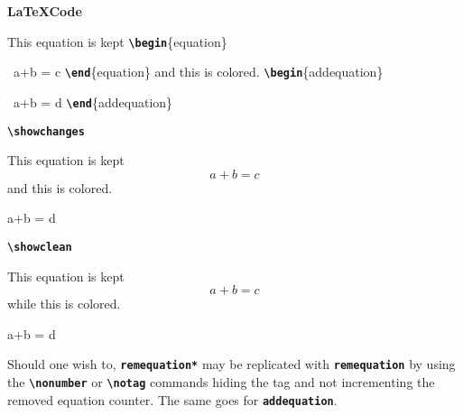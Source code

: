 \documentclass[a4paper]{ltxdoc}
\newcommand{\writecommand}[1]{\texttt{\textbf{{\textbackslash#1}}}}
\newcommand{\writeenv}[1]{\texttt{\textbf{{#1}}}}
\newcommand{\writearg}[1]{\{#1\}}
\begin{document}
\begin{center}
    \begin{minipage}[t]{0.3\linewidth}
    \textbf{\LaTeX Code}
    
    This equation is kept \newline
    \writecommand{begin}\writearg{equation}

    ~\quad a+b = c\newline
    \writecommand{end}\writearg{equation}\newline
    and this is colored.\newline
    \writecommand{begin}\writearg{addequation}

    ~\quad a+b = d\newline
    \writecommand{end}\writearg{addequation}\newline
    
    \end{minipage}
    \hfill
    \begin{minipage}[t]{0.3\linewidth}
    \writecommand{showchanges}
    \showchanges
    
    This equation is kept
    \begin{equation}
        a+b = c
    \end{equation}
    and this is colored.
    \begin{addequation}
        a+b = d
    \end{addequation}\addtocounter{equation}{-2}
    
    \end{minipage}
    \hfill
    \begin{minipage}[t]{0.3\linewidth}   
    \writecommand{showclean}
    \showclean
    
    This equation is kept
    \begin{equation}
        a+b = c
    \end{equation}
    while this is colored.
    \begin{addequation}
        a+b = d
    \end{addequation}\addtocounter{equation}{-2}

\end{minipage}
\end{center}
\showchanges

Should one wish to, \writeenv{remequation*} may be replicated with \writeenv{remequation} by using the \writecommand{nonumber} or \writecommand{notag} commands hiding the tag and not incrementing the removed equation counter.  The same goes for \writeenv{addequation}.
\end{document}
